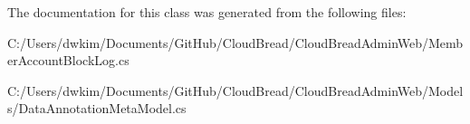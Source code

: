 The documentation for this class was generated from the following files\+:\begin{DoxyCompactItemize}
\item 
C\+:/\+Users/dwkim/\+Documents/\+Git\+Hub/\+Cloud\+Bread/\+Cloud\+Bread\+Admin\+Web/Member\+Account\+Block\+Log.\+cs\item 
C\+:/\+Users/dwkim/\+Documents/\+Git\+Hub/\+Cloud\+Bread/\+Cloud\+Bread\+Admin\+Web/\+Models/Data\+Annotation\+Meta\+Model.\+cs\end{DoxyCompactItemize}
